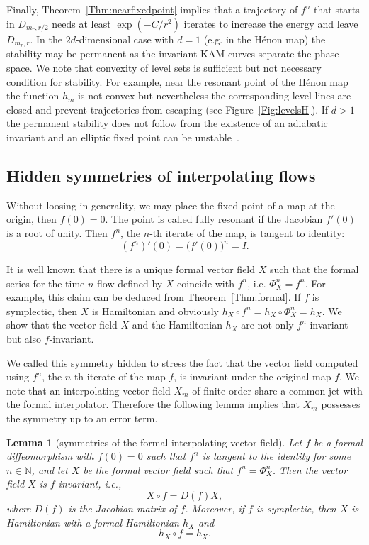 \documentclass[a4paper,12pt]{article}
\newcommand{\N}{\mathbb{N}}
\newtheorem{lemma}[thm]{Lemma}
\begin{document}
Finally, Theorem~\ref{Thm:nearfixedpoint} implies that a trajectory of $f^n$ that starts in $D_{m_r,r/2}$ needs  at least $\exp(-C/r^2)$ iterates to increase the energy and leave $D_{m_r,r}$.
In the $2d$-dimensional case with $d=1$ (e.g. in the Hénon map) the stability may be permanent
as the invariant KAM curves separate the phase space.
We note that convexity of level sets is sufficient but not necessary condition for stability. For example,  near the resonant point of
the Hénon map the function $h_m$ is not convex but nevertheless 
the corresponding  level lines are closed and prevent trajectories
from escaping (see Figure~\ref{Fig:levelsH}).
If $d>1$ the permanent stability does not follow from the existence
of an adiabatic invariant and an elliptic fixed point can be unstable~\cite{FMS2020}.


\subsection{Hidden symmetries of  interpolating flows\label{Se:symmetries}}


Without loosing in generality, we may place the fixed point of a map at the origin, then $f(0)=0$.
The point is called fully resonant if the Jacobian $f'(0)$ is a root of unity. Then $f^n$,
the $n$-th iterate of the map, is tangent to identity:
\[
(f^n)'(0)=\bigl(f'(0)\bigr)^n=I.
\]

It is well known that there is a unique formal vector field $X$ such that 
the formal series for the time-$n$ flow defined by $X$ coincide
with $f^n$, i.e. 
\(\Phi^n_X = f^n.\)
For example, this claim can be deduced from Theorem~\ref{Thm:formal}.
If $f$ is symplectic, then $X$ is Hamiltonian and obviously 
\(
h_X\circ f^n= h_X\circ \Phi^n_X=h_X.
\)
We show that the vector field $X$ and the Hamiltonian $h_X$ are
not only $f^n$-invariant but also $f$-invariant.

We called this symmetry hidden to stress the fact that the vector 
field computed using $f^n$, the $n$-th iterate of the map $f$, is invariant under the original map $f$.
We note that an interpolating vector field $X_m$ of finite order 
share a common jet with the formal interpolator. Therefore the following lemma
implies that $X_m$ possesses the symmetry up to an error term.


\begin{lemma}[symmetries of the formal interpolating vector field]
\label{Le:symmetry}
Let $f$ be a formal diffeomorphism with $f(0)=0$ such that $f^n $ is tangent to the identity 
for some $n\in\N$,  and let $X$ be the formal
vector field such that $f^n=\Phi^n_X$. Then the vector field $X$ is $f$-invariant, i.e.,
\begin{equation}\label{Eq:fsymm}
X\circ f = D(f) X,
\end{equation}
where $D(f)$ is the Jacobian matrix of $f$.
Moreover, if $f$ is symplectic, then $X$ is Hamiltonian with a formal Hamiltonian $h_X$
and 
\begin{equation}\label{Eq:h-f-invar}
h_X\circ f=h_X.
\end{equation}
\end{lemma}
\end{document}
